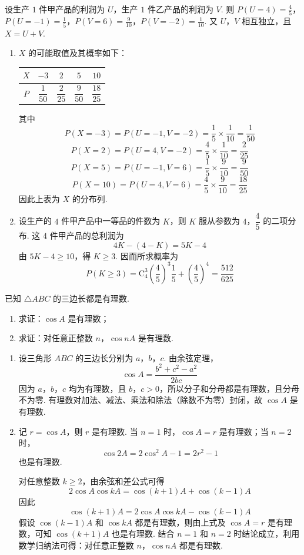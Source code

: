 \begin{solution}
设生产 \(1\) 件甲产品的利润为 \(U\)，生产 \(1\) 件乙产品的利润为 \(V\). 则 \(P(U=4)=\frac45\)，\(P(U=-1)=\frac15\)，\(P(V=6)=\frac9{10}\)，\(P(V=-2)=\frac1{10}\).
又 \(U\)，\(V\) 相互独立，且 \(X=U+V\).

\begin{enumerate}
\item \(X\) 的可能取值及其概率如下：
\begin{center}
\begin{tabular}{c|cccc}
\(X\) & \(-3\) & \(2\) & \(5\) & \(10\) \\
\hline
\(P\) & \(\dfrac1{50}\) & \(\dfrac2{25}\) & \(\dfrac9{50}\) & \(\dfrac{18}{25}\)
\end{tabular}
\end{center}
其中
\[
P(X=-3)=P(U=-1,V=-2)=\frac15\times\frac1{10}=\frac1{50}
\]
\[
P(X=2)=P(U=4,V=-2)=\frac45\times\frac1{10}=\frac2{25}
\]
\[
P(X=5)=P(U=-1,V=6)=\frac15\times\frac9{10}=\frac9{50}
\]
\[
P(X=10)=P(U=4,V=6)=\frac45\times\frac9{10}=\frac{18}{25}
\]
因此上表为 \(X\) 的分布列.

\item 设生产的 \(4\) 件甲产品中一等品的件数为 \(K\)，则 \(K\) 服从参数为 \(4\)，\(\dfrac45\) 的二项分布. 这 \(4\) 件甲产品的总利润为
\[
4K-(4-K)=5K-4
\]
由 \(5K-4\geqslant10\)，得 \(K\geqslant3\). 因而所求概率为
\[
P(K\geqslant3)
=\mathrm C_4^3\left(\frac45\right)^3\frac15+\left(\frac45\right)^4
=\frac{512}{625}
\]
\end{enumerate}
\end{solution}

\begin{problem}
已知 \(\triangle ABC\) 的三边长都是有理数.

\begin{enumerate}
\item 求证：\(\cos A\) 是有理数；
\item 求证：对任意正整数 \(n\)，\(\cos nA\) 是有理数.
\end{enumerate}
\end{problem}

\begin{solution}
\begin{enumerate}
\item 设三角形 \(ABC\) 的三边长分别为 \(a\)，\(b\)，\(c\). 由余弦定理，
\[
\cos A=\frac{b^2+c^2-a^2}{2bc}
\]
因为 \(a\)，\(b\)，\(c\) 均为有理数，且 \(b\)，\(c>0\)，所以分子和分母都是有理数，且分母不为零. 有理数对加法、减法、乘法和除法（除数不为零）封闭，故 \(\cos A\) 是有理数.

\item 记 \(r=\cos A\)，则 \(r\) 是有理数. 当 \(n=1\) 时，\(\cos A=r\) 是有理数；当 \(n=2\) 时，
\[
\cos 2A=2\cos^2A-1=2r^2-1
\]
也是有理数.

对任意整数 \(k\geqslant2\)，由余弦和差公式可得
\[
2\cos A\cos kA=\cos(k+1)A+\cos(k-1)A
\]
因此
\[
\cos(k+1)A=2\cos A\cos kA-\cos(k-1)A
\]
假设 \(\cos(k-1)A\) 和 \(\cos kA\) 都是有理数，则由上式及 \(\cos A=r\) 是有理数，可知 \(\cos(k+1)A\) 也是有理数. 结合 \(n=1\) 和 \(n=2\) 时结论成立，利用数学归纳法可得：对任意正整数 \(n\)，\(\cos nA\) 都是有理数.
\end{enumerate}
\end{solution}
